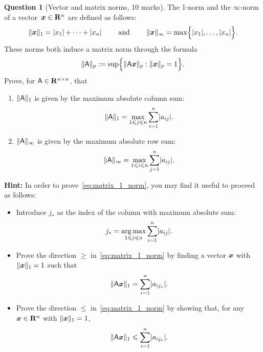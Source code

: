 \documentclass[11pt]{article}
\theoremstyle{definition}
\newtheorem{question}{Question}
\begin{document}
\newpage
\begin{question}
    [Vector and matrix norms, 10 marks]
    The 1-norm and the $\infty$-norm of a vector~$\mathbf{\boldsymbol{x}} \in \mathbf R^n$ are defined as follows:
    \[
        \lVert\mathbf{\boldsymbol{x}}\rVert_1 = \lvert x_1 \rvert + \dotsb + \lvert x_n \rvert
        \qquad \text{ and } \qquad
        \lVert\mathbf{\boldsymbol{x}}\rVert_{\infty} = \max \Bigl\{ \lvert x_1 \rvert, \dotsc, \lvert x_n \rvert \Bigr\}.
    \]
    These norms both induce a matrix norm through the formula
    \[
        \lVert\mathsf A\rVert_p
        := \sup \Bigl\{ \lVert\mathsf A \mathbf{\boldsymbol{x}}\rVert_p : \lVert\mathbf{\boldsymbol{x}}\rVert_p = 1 \Bigr\}.
    \]
    Prove, for $\mathsf A \in \mathbf R^{n \times n}$, that
    \begin{enumerate}
        \item
            $\lVert\mathsf A\rVert_1$ is given by the maximum absolute column sum:
            \begin{equation}
                \label{eq:matrix_1_norm}
               \lVert\mathsf A\rVert_1 = \max_{1 \leqslant j \leqslant n}  \sum_{i=1}^{n} \lvert a_{ij}\rvert.
            \end{equation}

        \item
            $\lVert\mathsf A\rVert_{\infty}$ is given by the maximum absolute row sum:
            \[
                \lVert\mathsf A\rVert_{\infty} = \max_{1 \leqslant i \leqslant n}  \sum_{j=1}^{n} \lvert a_{ij}\rvert.
            \]
    \end{enumerate}

    \textbf{Hint:} In order to prove~\eqref{eq:matrix_1_norm},
    you may find it useful to proceed as follows:
    \begin{itemize}
        \item
            Introduce $j_*$ as the index of the column with maximum absolute sum:
            \[
                j_* = \operatorname*{arg\,max}_{1 \leqslant j \leqslant n}  \sum_{i=1}^{n} \lvert a_{ij}\rvert.
            \]
        \item
            Prove the direction $\geq$ in~\eqref{eq:matrix_1_norm} by finding a vector $\mathbf{\boldsymbol{x}}$ with $\lVert\mathbf{\boldsymbol{x}}\rVert_1 = 1$ such that
            \[
                \lVert\mathsf A \mathbf{\boldsymbol{x}}\rVert_1 =  \sum_{i=1}^{n} \lvert a_{ij_*}\rvert.
            \]

        \item
            Prove the direction $\leq$ in~\eqref{eq:matrix_1_norm} by showing that,
            for any $\mathbf{\boldsymbol{x}} \in \mathbf R^n$ with $\lVert\mathbf{\boldsymbol{x}}\rVert_1 = 1$,
            \[
               \lVert\mathsf A \mathbf{\boldsymbol{x}}\rVert_1 \leqslant  \sum_{i=1}^{n} \lvert a_{ij_*}\rvert.
           \]
    \end{itemize}
\end{question}
\end{document}
